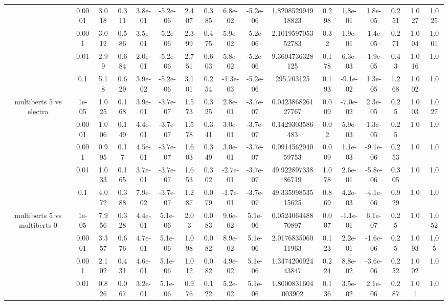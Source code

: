 \begin{tabular}{|c|c|c|c|c|c|c|c|c|c|c|c|c|c|c|c|c|}
 & 0.0001 & 3.018 & 0.311 & 3.8e-01 & -5.2e-06 & 2.407 & 0.385 & 6.8e-02 & -5.2e-06 & 1.820852994918823 & 0.298 & 1.8e-01 & 1.8e-05 & 0.251 & 1.027 & 1.025 \\
 & 0.001 & 3.012 & 0.586 & 3.5e-01 & -5.2e-06 & 2.399 & 0.475 & 5.9e-02 & -5.2e-06 & 2.101959705352783 & 0.32 & 1.9e-01 & -1.4e-05 & 0.271 & 1.004 & 1.001 \\
 & 0.01 & 2.99 & 0.684 & 2.0e-01 & -5.2e-06 & 2.751 & 0.603 & 5.8e-02 & -5.2e-06 & 9.3604736328125 & 0.178 & 6.3e-03 & -1.9e-05 & 0.43 & 1.016 & 1.0 \\
 & 0.1 & 5.18 & 0.629 & 3.9e-02 & -5.2e-06 & 3.101 & 0.254 & -1.3e-03 & -5.2e-06 & 295.703125 & 0.193 & -9.1e-02 & 1.3e-05 & 1.268 & 1.002 & 1.0 \\
\hline
\multirow{5}{*}{multiberts 5 vs electra } & 1e-05 & 1.025 & 0.168 & 3.9e-01 & -3.7e-07 & 1.573 & 0.325 & 2.8e-01 & -3.7e-07 & 0.042386826127767 & 0.009 & -7.0e-02 & 2.3e-05 & 0.25 & 1.003 & 1.027 \\
 & 0.0001 & 1.006 & 0.149 & 4.4e-01 & -3.7e-07 & 1.578 & 0.341 & 3.0e-01 & -3.7e-07 & 0.1429303586483 & 0.02 & 5.9e-03 & 1.3e-05 & 0.25 & 1.0 & 1.0 \\
 & 0.001 & 0.995 & 0.17 & 4.5e-01 & -3.7e-07 & 1.603 & 0.349 & 3.0e-01 & -3.7e-07 & 0.091456294059753 & 0.009 & 1.1e-03 & -9.1e-06 & 0.253 & 1.0 & 1.0 \\
 & 0.01 & 1.033 & 0.165 & 3.7e-01 & -3.7e-07 & 1.653 & 0.302 & -2.7e-01 & -3.7e-07 & 49.92289733886719 & 1.078 & 2.6e-01 & -5.8e-06 & 0.305 & 1.0 & 1.0 \\
 & 0.1 & 4.072 & 0.388 & 7.9e-02 & -3.7e-07 & 1.287 & 0.079 & -1.7e-01 & -3.7e-07 & 49.33599853515625 & 0.869 & 4.2e-03 & -4.1e-06 & 0.929 & 1.0 & 1.0 \\
\hline
\multirow{5}{*}{multiberts 5 vs multiberts 0} & 1e-05 & 7.956 & 0.328 & 4.4e-01 & 5.1e-06 & 2.03 & 0.083 & 9.6e-02 & 5.1e-06 & 0.052406448870897 & 0.007 & -1.1e-01 & 6.1e-07 & 0.25 & 1.0 & 1.052 \\
 & 0.0001 & 3.357 & 0.676 & 4.7e-01 & 5.1e-06 & 1.098 & 0.082 & 8.9e-02 & 5.1e-06 & 2.017683506011963 & 0.123 & 2.2e-01 & -1.6e-06 & 0.25 & 1.093 & 1.05 \\
 & 0.001 & 2.102 & 0.431 & 4.6e-01 & 5.1e-06 & 1.012 & 0.082 & 4.9e-02 & 5.1e-06 & 1.347420692443847 & 0.224 & 8.8e-02 & -3.6e-06 & 0.252 & 1.002 & 1.0 \\
 & 0.01 & 0.826 & 0.067 & 3.2e-01 & 5.1e-06 & 0.976 & 0.122 & 5.2e-02 & 5.1e-06 & 1.8000831604003902 & 0.136 & 3.5e-02 & 2.1e-06 & 0.287 & 1.01 & 1.0 \\

\end{tabular}
